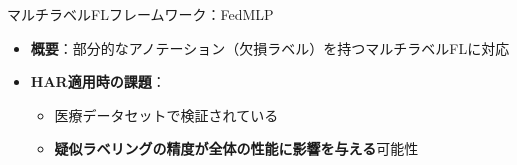 \documentclass[unicode,12pt,aspectratio=169,dvipdfmx]{beamer}
\begin{document}
\begin{frame}{マルチラベルFLフレームワーク：FedMLP\cite{FedMLP}}
\begin{itemize}
    \item \textbf{概要}：{部分的なアノテーション（欠損ラベル）を持つマルチラベルFL}に対応
    \item \textbf{HAR適用時の課題}：
    \begin{itemize}
        \item 医療データセットで検証されている
        \item \textbf{疑似ラベリングの精度が全体の性能に影響を与える}可能性
    \end{itemize}
\end{itemize}
\end{frame}

\end{document}
